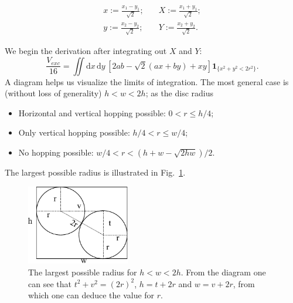 \documentclass[superscriptaddress,pre,reprint,showpacs,twocolumn]{revtex4-1}
\newcommand{\defeq}{:=}
\newcommand{\rd}[1]{\mathrm{d}{#1} \,}
\newcommand{\indicatorsymbol}{\mathbf{1}}
\newcommand{\indicator}[1]{\indicatorsymbol_{ \{   #1 \} } }
\begin{document}
\begin{equation}\label{cambiocoor2d}
  \begin{split}
 x  \defeq \frac{x_1 - y_1}{\sqrt{2}};  &
\quad X  \defeq \frac{x_1 + y_1}{\sqrt{2}};  \\
 y  \defeq \frac{x_2 - y_2}{\sqrt{2}}; & 
\quad Y  \defeq \frac{x_2 + y_2}{\sqrt{2}}.
  \end{split}
\end{equation}

We begin the derivation after integrating out $X$ and $Y$:
\begin{equation}\label{volgral2d}
\frac{V_{exc}}{16}  =\iint \rd x \rd y \left[ 2ab-\sqrt{2}(ax+by)+x y \right]
\indicator{x^2+y^2 < 2r^2 }.
\end{equation}
A diagram helps us visualize the limits of integration. The most general
case is (without loss of generality) $h < w < 2h$; as the disc radius 
\begin{itemize}
\item Horizontal and vertical hopping possible: $0 <r \leq h/4$;
\item Only vertical hopping possible: $h/4 < r \leq w/4$;
\item No hopping possible: $w/4 < r < (h+w - \sqrt{2hw}) / 2$.
\end{itemize}
The largest possible radius is illustrated in Fig.~\ref{radiomaximo}.

\begin{figure}[h]
  \centering
  \includegraphics[width=0.4\textwidth]{figures/DiagramaRadioMaximo.pdf}
  \caption{The largest possible radius for $h<w<2h$. From the diagram
    one can see that $t^2+v^2=(2r)^2$, $h=t+2r$ and $w=v+2r$, from which
    one can deduce the value for $r$.}
  \label{radiomaximo}
\end{figure}
\end{document}
